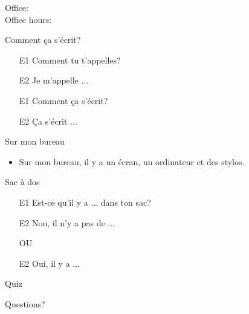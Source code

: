 \documentclass{beamer}
\subtitle[Il y a, c'est, ce sont]{Il y a, c'est, ce sont}
\begin{document}
  \begin{frame}
    \titlepage
    \tiny{Office: \\
          Office hours: }
  \end{frame}


  \begin{frame}{Comment ça s'écrit? }
    \begin{itemize}
      \item[E1] Comment tu t'appelles?
      \item[E2] Je m'appelle ...
      \item[E1] Comment ça s'écrit?
      \item[E2] Ça s'écrit ...
    \end{itemize}
  \end{frame}

  \begin{frame}{Sur mon bureau }
    \begin{itemize}
      \item Sur mon bureau, il y a un écran, un ordinateur et des stylos.
    \end{itemize}
  \end{frame}

  \begin{frame}{Sac à dos}
    \begin{itemize}
      \item[E1] Est-ce qu'il y a ... dans ton sac?
      \item[E2] Non, il n'y a pas de ...
      \item[] OU
      \item[E2] Oui, il y a ...
    \end{itemize}
  \end{frame}

  \begin{frame}{}
    \begin{center}
      \Large Quiz
    \end{center}
  \end{frame}

  \begin{frame}{}
    \begin{center}
      \Large Questions?
    \end{center}
  \end{frame}
\end{document}
